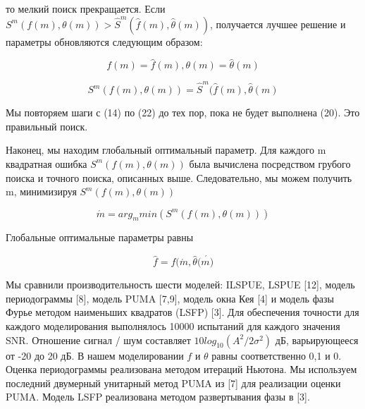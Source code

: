то мелкий поиск прекращается. Если $S^m(f(m), \theta (m)) > \hat{S}^m (\hat{f}(m),\hat{\theta}(m))$, получается лучшее решение и параметры обновляются следующим образом:

\begin{equation}
\label{eq:equation1.61}
	f(m)=\hat{f}(m),\theta(m)=\hat{\theta}(m)
\end{equation}

\begin{equation}
\label{eq:equation1.62}
	S^m(f(m),\theta(m))=\hat{S}^m(\hat{f}(m),\hat{\theta}(m)
\end{equation}

Мы повторяем шаги с (14) по (22) до тех пор, пока не будет выполнена (20). Это правильный поиск.

Наконец, мы находим глобальный оптимальный параметр. Для каждого m квадратная ошибка $S^m (f (m), \theta (m))$ была вычислена посредством грубого поиска и точного поиска, описанных выше. Следовательно, мы можем получить m, минимизируя $S^m (f (m), \theta (m))$

\begin{equation}
\label{eq:equation1.63}
	\acute{m}= arg_m min(S^m(f(m),\theta(m)))
\end{equation}

Глобальные оптимальные параметры равны

\begin{equation}
\label{eq:equation1.64}
	\hat{f}=f(\acute{m}, \hat{\theta}(\acute{m)}
\end{equation}

Мы сравнили производительность шести моделей: ILSPUE, LSPUE [12], модель периодограммы [8], модель PUMA [7,9], модель окна Кея [4] и модель фазы Фурье методом наименьших квадратов (LSFP) [3]. Для обеспечения точности для каждого моделирования выполнялось 10000 испытаний для каждого значения SNR. Отношение сигнал / шум составляет $10log_{10} (A^2 / 2\sigma^2)$ дБ, варьирующееся от -20 до 20 дБ. В нашем моделировании $f$ и $\theta$ равны соответственно 0,1 и 0. Оценка периодограммы реализована методом итераций Ньютона. Мы используем последний двумерный унитарный метод PUMA из [7] для реализации оценки PUMA. Модель LSFP реализована методом развертывания фазы в [3].

